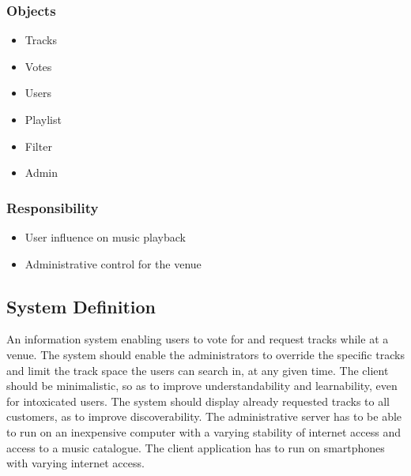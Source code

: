\subsubsection{Objects}
\begin{itemize}
    \item Tracks
    \item Votes
    \item Users
    \item Playlist
    \item Filter
    \item Admin
\end{itemize}

\subsubsection{Responsibility}
\begin{itemize}
    \item User influence on music playback
    \item Administrative control for the venue
\end{itemize}

\subsection{System Definition}
An information system enabling users to vote for and request tracks while at a venue. The system should enable the administrators to override the specific tracks and limit the track space the users can search in, at any given time. The client should be minimalistic, so as to improve understandability and learnability, even for intoxicated users. The system should display already requested tracks to all customers, as to improve discoverability.
The administrative server has to be able to run on an inexpensive computer with a varying stability of internet access and access to a music catalogue. The client application has to run on smartphones with varying internet access.
